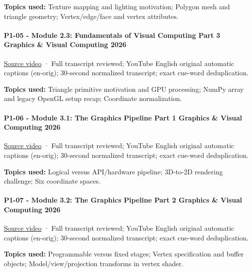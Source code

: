 \textbf{Topics used:} Texture mapping and lighting motivation; Polygon mesh and triangle geometry; Vertex/edge/face and vertex attributes.

\paragraph{P1-05 - Module 2.3: Fundamentals of Visual Computing Part 3 Graphics \& Visual Computing 2026}\label{p1-05---module-2.3-fundamentals-of-visual-computing-part-3-graphics-visual-computing-2026}

\href{https://www.youtube.com/watch?v=VPxqKOYjpG0}{Source video} · Full transcript reviewed; YouTube English original automatic captions (en-orig); 30-second normalized transcript; exact cue-word deduplication.

\textbf{Topics used:} Triangle primitive motivation and GPU processing; NumPy array and legacy OpenGL setup recap; Coordinate normalization.

\paragraph{P1-06 - Module 3.1: The Graphics Pipeline Part 1 Graphics \& Visual Computing 2026}\label{p1-06---module-3.1-the-graphics-pipeline-part-1-graphics-visual-computing-2026}

\href{https://www.youtube.com/watch?v=QEiWsz7cmnw}{Source video} · Full transcript reviewed; YouTube English original automatic captions (en-orig); 30-second normalized transcript; exact cue-word deduplication.

\textbf{Topics used:} Logical versus API/hardware pipeline; 3D-to-2D rendering challenge; Six coordinate spaces.

\paragraph{P1-07 - Module 3.2: The Graphics Pipeline Part 2 Graphics \& Visual Computing 2026}\label{p1-07---module-3.2-the-graphics-pipeline-part-2-graphics-visual-computing-2026}

\href{https://www.youtube.com/watch?v=rRQiFwFzFJM}{Source video} · Full transcript reviewed; YouTube English original automatic captions (en-orig); 30-second normalized transcript; exact cue-word deduplication.

\textbf{Topics used:} Programmable versus fixed stages; Vertex specification and buffer objects; Model/view/projection transforms in vertex shader.

